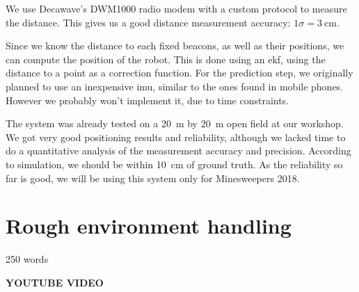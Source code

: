 We use Decawave's DWM1000 radio modem with a custom protocol to measure the distance.
This gives us a good distance measurement accuracy: $1 \sigma = \SI{3}{\centi\meter}$.

Since we know the distance to each fixed beacons, as well as their positions, we can compute the position of the robot.
This is done using an \gls{ekf}, using the distance to a point as a correction function.
For the prediction step, we originally planned to use an inexpensive \gls{imu}, similar to the ones found in mobile phones.
However we probably won't implement it, due to time constraints.

The system was already tested on a \SI{20}{\meter} by \SI{20}{\meter} open field at our workshop.
We got very good positioning results and reliability, although we lacked time to do a quantitative analysis of the measurement accuracy and precision.
According to simulation, we should be within \SI{10}{\centi\meter} of ground truth.
As the reliability so far is good, we will be using this system only for Minesweepers 2018.


\section{Rough environment handling}

250 words

\textbf{YOUTUBE VIDEO}
